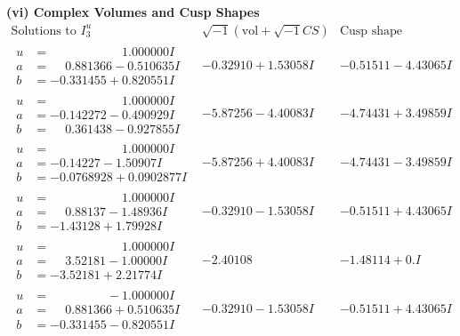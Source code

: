 \documentclass[1p]{elsarticle_modified}
\theoremstyle{definition}
\newcommand{\I}{\sqrt{-1}}
\begin{document}
\newpage\flushleft \textbf{(vi) Complex Volumes and Cusp Shapes}
$$\begin{array}{c|c|c}  
\text{Solutions to }I^u_{3}& \I (\text{vol} + \sqrt{-1}CS) & \text{Cusp shape}\\
 \hline 
\begin{aligned}
u &= \phantom{-0.000000 -}1.000000 I \\
a &= \phantom{-}0.881366 - 0.510635 I \\
b &= -0.331455 + 0.820551 I\end{aligned}
 & -0.32910 + 1.53058 I & -0.51511 - 4.43065 I \\ \hline\begin{aligned}
u &= \phantom{-0.000000 -}1.000000 I \\
a &= -0.142272 - 0.490929 I \\
b &= \phantom{-}0.361438 - 0.927855 I\end{aligned}
 & -5.87256 - 4.40083 I & -4.74431 + 3.49859 I \\ \hline\begin{aligned}
u &= \phantom{-0.000000 -}1.000000 I \\
a &= -0.14227 - 1.50907 I \\
b &= -0.0768928 + 0.0902877 I\end{aligned}
 & -5.87256 + 4.40083 I & -4.74431 - 3.49859 I \\ \hline\begin{aligned}
u &= \phantom{-0.000000 -}1.000000 I \\
a &= \phantom{-}0.88137 - 1.48936 I \\
b &= -1.43128 + 1.79928 I\end{aligned}
 & -0.32910 - 1.53058 I & -0.51511 + 4.43065 I \\ \hline\begin{aligned}
u &= \phantom{-0.000000 -}1.000000 I \\
a &= \phantom{-}3.52181 - 1.00000 I \\
b &= -3.52181 + 2.21774 I\end{aligned}
 & -2.40108\phantom{ +0.000000I} & -1.48114 + 0. I\phantom{ +0.000000I} \\ \hline\begin{aligned}
u &= \phantom{-0.000000 } -1.000000 I \\
a &= \phantom{-}0.881366 + 0.510635 I \\
b &= -0.331455 - 0.820551 I\end{aligned}
 & -0.32910 - 1.53058 I & -0.51511 + 4.43065 I \\ \hline\begin{aligned}

\end{aligned}
\end{array}$$
\end{document}
